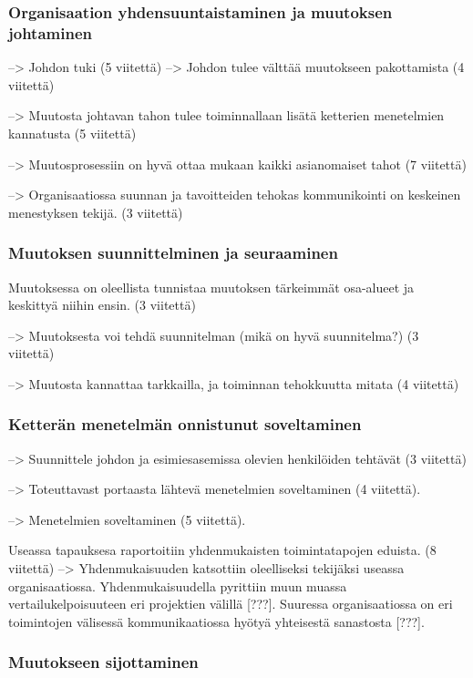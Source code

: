 \subsubsection{Organisaation yhdensuuntaistaminen ja muutoksen johtaminen}

--> Johdon tuki (5 viitettä)
--> Johdon tulee välttää muutokseen pakottamista (4 viitettä)

--> Muutosta johtavan tahon tulee toiminnallaan lisätä ketterien menetelmien
kannatusta (5 viitettä)

--> Muutosprosessiin on hyvä ottaa mukaan kaikki asianomaiset tahot (7 viitettä)

--> Organisaatiossa suunnan ja tavoitteiden tehokas kommunikointi on keskeinen
menestyksen tekijä. (3 viitettä)

\subsubsection{Muutoksen suunnittelminen ja seuraaminen}

Muutoksessa on oleellista tunnistaa muutoksen tärkeimmät osa-alueet ja keskittyä
niihin ensin. (3 viitettä)

--> Muutoksesta voi tehdä suunnitelman (mikä on hyvä suunnitelma?) (3 viitettä)

--> Muutosta kannattaa tarkkailla, ja toiminnan tehokkuutta mitata (4 viitettä)

\subsubsection{Ketterän menetelmän onnistunut soveltaminen}

--> Suunnittele johdon ja esimiesasemissa olevien henkilöiden tehtävät
(3 viitettä)

--> Toteuttavast portaasta lähtevä menetelmien soveltaminen (4 viitettä).

--> Menetelmien soveltaminen (5 viitettä).

Useassa tapauksesa raportoitiin yhdenmukaisten toimintatapojen eduista.
(8 viitettä)
--> Yhdenmukaisuuden katsottiin oleelliseksi tekijäksi useassa organisaatiossa.
Yhdenmukaisuudella pyrittiin muun muassa vertailukelpoisuuteen eri projektien
välillä [???]. Suuressa organisaatiossa on eri toimintojen välisessä
kommunikaatiossa hyötyä yhteisestä sanastosta [???].

\subsubsection{Muutokseen sijottaminen}

